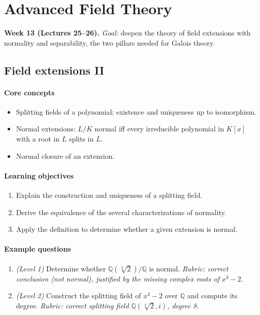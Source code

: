 \documentclass{article}
\begin{document}
\section{Advanced Field Theory}
\textbf{Week 13 (Lectures 25--26).} \emph{Goal:} deepen the theory of field extensions with normality and separability, the two pillars needed for Galois theory.

\subsection{Field extensions II}
\paragraph{Core concepts}
\begin{itemize}[nosep]
  \item Splitting fields of a polynomial; existence and uniqueness up to isomorphism.
  \item Normal extensions: $L/K$ normal iff every irreducible polynomial in $K[x]$ with a root in $L$ splits in $L$.
  \item Normal closure of an extension.
\end{itemize}
\paragraph{Learning objectives}
\begin{enumerate}[nosep]
  \item Explain the construction and uniqueness of a splitting field.
  \item Derive the equivalence of the several characterizations of normality.
  \item Apply the definition to determine whether a given extension is normal.
\end{enumerate}
\paragraph{Example questions}
\begin{enumerate}[nosep]
  \item \emph{(Level 1)} Determine whether $\mathbb{Q}(\sqrt[3]{2})/\mathbb{Q}$ is normal. \emph{Rubric: correct conclusion (not normal), justified by the missing complex roots of $x^3-2$.}
  \item \emph{(Level 2)} Construct the splitting field of $x^4-2$ over $\mathbb{Q}$ and compute its degree. \emph{Rubric: correct splitting field $\mathbb{Q}(\sqrt[4]{2},i)$, degree 8.}
\end{enumerate}
\end{document}
